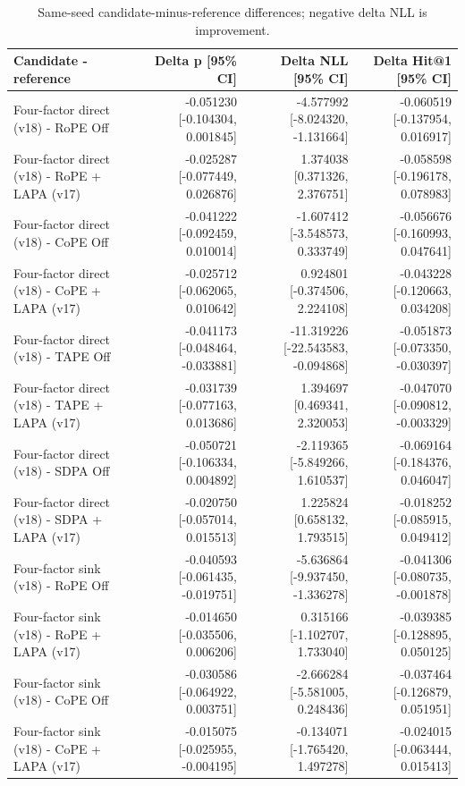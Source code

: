 \begin{table}[t]
\centering
\scriptsize
\caption{Same-seed candidate-minus-reference differences; negative delta NLL is improvement.}
\begin{tabular}{lrrr}
\toprule
Candidate - reference & Delta p [95\% CI] & Delta NLL [95\% CI] & Delta Hit@1 [95\% CI] \\
\midrule
Four-factor direct (v18) - RoPE Off & -0.051230 [-0.104304, 0.001845] & -4.577992 [-8.024320, -1.131664] & -0.060519 [-0.137954, 0.016917] \\
Four-factor direct (v18) - RoPE + LAPA (v17) & -0.025287 [-0.077449, 0.026876] & 1.374038 [0.371326, 2.376751] & -0.058598 [-0.196178, 0.078983] \\
Four-factor direct (v18) - CoPE Off & -0.041222 [-0.092459, 0.010014] & -1.607412 [-3.548573, 0.333749] & -0.056676 [-0.160993, 0.047641] \\
Four-factor direct (v18) - CoPE + LAPA (v17) & -0.025712 [-0.062065, 0.010642] & 0.924801 [-0.374506, 2.224108] & -0.043228 [-0.120663, 0.034208] \\
Four-factor direct (v18) - TAPE Off & -0.041173 [-0.048464, -0.033881] & -11.319226 [-22.543583, -0.094868] & -0.051873 [-0.073350, -0.030397] \\
Four-factor direct (v18) - TAPE + LAPA (v17) & -0.031739 [-0.077163, 0.013686] & 1.394697 [0.469341, 2.320053] & -0.047070 [-0.090812, -0.003329] \\
Four-factor direct (v18) - SDPA Off & -0.050721 [-0.106334, 0.004892] & -2.119365 [-5.849266, 1.610537] & -0.069164 [-0.184376, 0.046047] \\
Four-factor direct (v18) - SDPA + LAPA (v17) & -0.020750 [-0.057014, 0.015513] & 1.225824 [0.658132, 1.793515] & -0.018252 [-0.085915, 0.049412] \\
Four-factor sink (v18) - RoPE Off & -0.040593 [-0.061435, -0.019751] & -5.636864 [-9.937450, -1.336278] & -0.041306 [-0.080735, -0.001878] \\
Four-factor sink (v18) - RoPE + LAPA (v17) & -0.014650 [-0.035506, 0.006206] & 0.315166 [-1.102707, 1.733040] & -0.039385 [-0.128895, 0.050125] \\
Four-factor sink (v18) - CoPE Off & -0.030586 [-0.064922, 0.003751] & -2.666284 [-5.581005, 0.248436] & -0.037464 [-0.126879, 0.051951] \\
Four-factor sink (v18) - CoPE + LAPA (v17) & -0.015075 [-0.025955, -0.004195] & -0.134071 [-1.765420, 1.497278] & -0.024015 [-0.063444, 0.015413] \\

\end{tabular}
\end{table}
